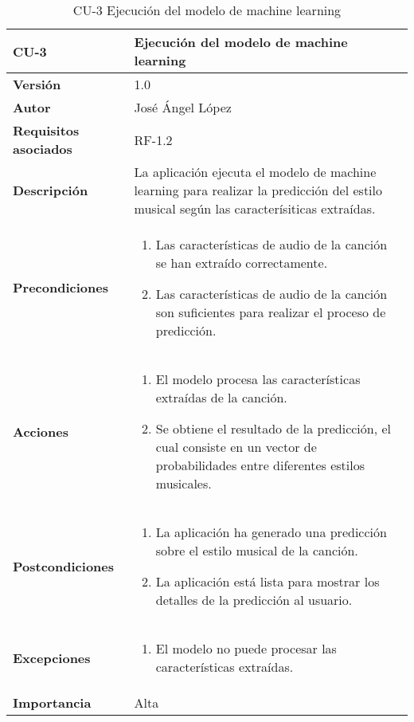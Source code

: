 \begin{table}[p]
	\centering
	\begin{tabularx}{\linewidth}{ p{} p{} }
		\toprule
		\textbf{CU-3}    & \textbf{Ejecución del modelo de machine learning}\\
		\toprule
		\textbf{Versión}              & 1.0    \\
		\textbf{Autor}                & José Ángel López \\
		\textbf{Requisitos asociados} & RF-1.2 \\
		\textbf{Descripción}          & La aplicación ejecuta el modelo de machine learning para realizar la predicción del estilo musical según las caracterísiticas extraídas. \\
		\textbf{Precondiciones}        & 
		\begin{enumerate}		    
			\def\labelenumi{\arabic{enumi}.}
			\tightlist
			\item Las características de audio de la canción se han extraído correctamente.
			\item Las características de audio de la canción son suficientes para realizar el proceso de predicción.
		\end{enumerate}\\
		\textbf{Acciones}             &
		\begin{enumerate}
			\def\labelenumi{\arabic{enumi}.}
			\tightlist
			\item El modelo procesa las características extraídas de la canción.
			\item Se obtiene el resultado de la predicción, el cual consiste en un vector de probabilidades entre diferentes estilos musicales.
		\end{enumerate}\\
		\textbf{Postcondiciones} &
		\begin{enumerate}
			\def\labelenumi{\arabic{enumi}.}
			\tightlist
			\item La aplicación ha generado una predicción sobre el estilo musical de la canción.
			\item La aplicación está lista para mostrar los detalles de la predicción al usuario.
		\end{enumerate}\\
		\textbf{Excepciones} &
		\begin{enumerate}
			\def\labelenumi{\arabic{enumi}.}
			\tightlist
			\item El modelo no puede procesar las características extraídas.
		\end{enumerate}\\
		\textbf{Importancia}          & Alta \\
		\bottomrule
	\end{tabularx}
	\caption{CU-3 Ejecución del modelo de machine learning}
\end{table}

